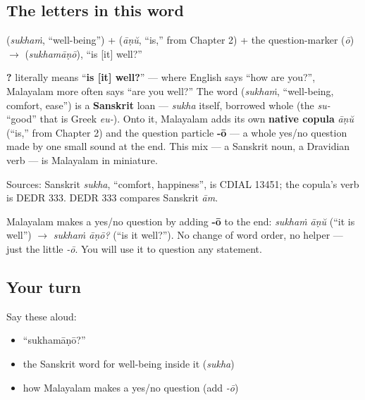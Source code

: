 \subsection*{The letters in this word}
\textbf{} (\emph{sukhaṁ}, \textquotedblleft{}well-being\textquotedblright{}) + \textbf{} (\emph{āṇŭ}, \textquotedblleft{}is,\textquotedblright{} from Chapter 2) + the question-marker \textbf{} (\emph{ō}) $\to$ \textbf{} (\emph{sukhamāṇō}), \textquotedblleft{}is {[}it{]} well?\textquotedblright{}

\begin{cousinweb}
\textbf{?} literally means \textquotedblleft{}\textbf{is {[}it{]} well?}\textquotedblright{} — where English says \textquotedblleft{}how are you?\textquotedblright{}, Malayalam more often says \textquotedblleft{}are you well?\textquotedblright{} The word \textbf{} (\emph{sukhaṁ}, \textquotedblleft{}well-being, comfort, ease\textquotedblright{}) is a \textbf{Sanskrit} loan — \emph{sukha} itself, borrowed whole (the \emph{su-} \textquotedblleft{}good\textquotedblright{} that is Greek \emph{eu-}). Onto it, Malayalam adds its own \textbf{native copula} \emph{āṇŭ} (\textquotedblleft{}is,\textquotedblright{} from Chapter 2) and the question particle \textbf{-ō} — a whole yes/no question made by one small sound at the end. This mix — a Sanskrit noun, a Dravidian verb — is Malayalam in miniature.

Sources: Sanskrit \emph{sukha}, \textquotedblleft{}comfort, happiness\textquotedblright{}, is CDIAL 13451; the copula's verb is DEDR 333. DEDR 333 compares Sanskrit \emph{ām}.
\end{cousinweb}

\begin{grammarlens}[title={Grammar Lens: turning a statement into a question}]
Malayalam makes a yes/no question by adding \textbf{-ō} to the end: \emph{sukhaṁ āṇŭ} (\textquotedblleft{}it is well\textquotedblright{}) $\to$ \emph{sukhaṁ āṇō?} (\textquotedblleft{}is it well?\textquotedblright{}). No change of word order, no helper — just the little \emph{-ō}. You will use it to question any statement.
\end{grammarlens}

\subsection*{Your turn}
Say these aloud:

\begin{itemize}
\raggedright
  \item \textquotedblleft{}sukhamāṇō?\textquotedblright{}
  \item the Sanskrit word for well-being inside it (\emph{sukha})
  \item how Malayalam makes a yes/no question (add \emph{-ō})
\end{itemize}

